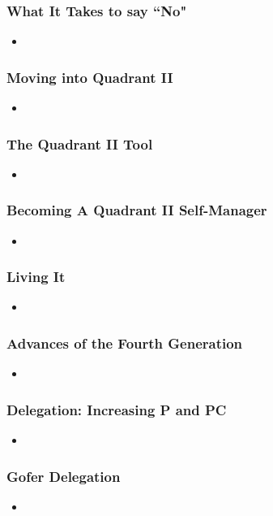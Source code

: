 \documentclass[11pt]{article}
\begin{document}
\subsubsection{What It Takes to say ``No"}
\begin{itemize}
\item 
\end{itemize}
\subsubsection{Moving into Quadrant II}
\begin{itemize}
\item 
\end{itemize}
\subsubsection{The Quadrant II Tool}
\begin{itemize}
\item 
\end{itemize}
\subsubsection{Becoming A Quadrant II Self-Manager}
\begin{itemize}
\item 
\end{itemize}
\subsubsection{Living It}
\begin{itemize}
\item 
\end{itemize}
\subsubsection{Advances of the Fourth Generation}
\begin{itemize}
\item 
\end{itemize}
\subsubsection{Delegation: Increasing P and PC}
\begin{itemize}
\item 
\end{itemize}
\subsubsection{Gofer Delegation}
\begin{itemize}
\item 
\end{itemize}
\end{document}
